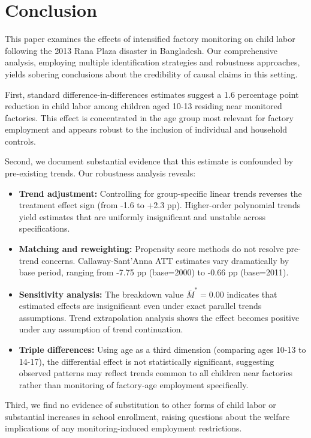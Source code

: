 \section{Conclusion}

This paper examines the effects of intensified factory monitoring on child labor following the 2013 Rana Plaza disaster in Bangladesh. Our comprehensive analysis, employing multiple identification strategies and robustness approaches, yields sobering conclusions about the credibility of causal claims in this setting.

First, standard difference-in-differences estimates suggest a 1.6 percentage point reduction in child labor among children aged 10-13 residing near monitored factories. This effect is concentrated in the age group most relevant for factory employment and appears robust to the inclusion of individual and household controls.

Second, we document substantial evidence that this estimate is confounded by pre-existing trends. Our robustness analysis reveals:
\begin{itemize}
\item \textbf{Trend adjustment:} Controlling for group-specific linear trends reverses the treatment effect sign (from -1.6 to +2.3 pp). Higher-order polynomial trends yield estimates that are uniformly insignificant and unstable across specifications.
\item \textbf{Matching and reweighting:} Propensity score methods do not resolve pre-trend concerns. Callaway-Sant'Anna ATT estimates vary dramatically by base period, ranging from -7.75 pp (base=2000) to -0.66 pp (base=2011).
\item \textbf{Sensitivity analysis:} The \citet{RambachanRoth2023} breakdown value $\bar{M}^* = 0.00$ indicates that estimated effects are insignificant even under exact parallel trends assumptions. Trend extrapolation analysis shows the effect becomes positive under any assumption of trend continuation.
\item \textbf{Triple differences:} Using age as a third dimension (comparing ages 10-13 to 14-17), the differential effect is not statistically significant, suggesting observed patterns may reflect trends common to all children near factories rather than monitoring of factory-age employment specifically.
\end{itemize}

Third, we find no evidence of substitution to other forms of child labor or substantial increases in school enrollment, raising questions about the welfare implications of any monitoring-induced employment restrictions.

